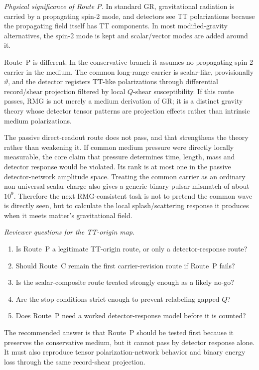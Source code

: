 \documentclass[11pt]{article}
\begin{document}
\medskip\noindent\textit{Physical significance of Route P.}
In standard GR, gravitational radiation is carried by a propagating spin-2
mode, and detectors see TT polarizations because the propagating field itself
has TT components.  In most modified-gravity alternatives, the spin-2 mode is
kept and scalar/vector modes are added around it.

Route~P is different.  In the conservative branch it assumes no propagating
spin-2 carrier in the medium.  The common long-range carrier is scalar-like,
provisionally \(\vartheta\), and the detector registers TT-like polarizations
through differential record/shear projection filtered by local \(Q\)-shear
susceptibility.  If this route passes, RMG is not merely a medium derivation
of GR; it is a distinct gravity theory whose detector tensor patterns are
projection effects rather than intrinsic medium polarizations.

The passive direct-readout route does not pass, and that strengthens the
theory rather than weakening it.  If common medium pressure were directly
locally measurable, the core claim that pressure determines time, length,
mass and detector response would be violated.  Its rank is at most one in the
passive detector-network amplitude space.  Treating the common carrier as an
ordinary non-universal scalar charge also gives a generic binary-pulsar
mismatch of about \(10^9\).  Therefore the next RMG-consistent task is not to
pretend the common wave is directly seen, but to calculate the local
splash/scattering response it produces when it meets matter's gravitational
field.

\medskip\noindent\textit{Reviewer questions for the TT-origin map.}
\begin{enumerate}
\item Is Route~P a legitimate TT-origin route, or only a detector-response
  route?
\item Should Route~C remain the first carrier-revision route if Route~P fails?
\item Is the scalar-composite route treated strongly enough as a likely no-go?
\item Are the stop conditions strict enough to prevent relabeling gapped \(Q\)?
\item Does Route~P need a worked detector-response model before it is counted?
\end{enumerate}
The recommended answer is that Route~P should be tested first because it
preserves the conservative medium, but it cannot pass by detector response
alone.  It must also reproduce tensor polarization-network behavior and binary
energy loss through the same record-shear projection.
\end{document}
